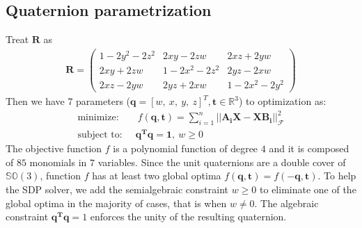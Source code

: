 \subsection{Quaternion parametrization}
Treat $\mathbf{R}$ as
\begin{align}
\mathbf{R}=\left(
\begin{matrix}
1 - 2 y^2 - 2 z^2 & 2 x y - 2 z w & 2 x z + 2 y w \\
2 x y + 2 z w & 1 - 2 x^2 - 2 z^2 & 2 y z - 2 x w \\
2 x z - 2 y w & 2 y z + 2 x w & 1 - 2 x^2 - 2 y^2
\end{matrix}
\right)
\end{align}
Then we have 7 parameters ($\mathbf{q}=[w,\ x,\ y,\ z]^T, \mathbf{t}\in \mathbb{R}^3$) to optimization as:
\begin{align}
\text{minimize: }\ &\ f(\mathbf{q, t})=\sum_{i=1}^{n} 
||\mathbf{A_iX-XB_i}||_{\mathcal{F}}^2 \\
\text{subject to: }\ & \mathbf{q^Tq=1},\ w \geq 0
\end{align}
The objective function $f$ is a polynomial function of degree $4$ and it is composed of $85$ monomials in $7$ variables. Since the unit quaternions are a double cover of $\mathbb{SO}(3)$, function $f$ has at least two global optima $f(\mathbf{q,t}) = f(\mathbf{-q,t})$. To help the SDP solver, we
add the semialgebraic constraint $w \geq 0$ to eliminate one of the global optima in the majority of cases, that is when $w \neq 0$. The algebraic constraint $\mathbf{q^Tq} = 1$ enforces the unity of the resulting quaternion.
